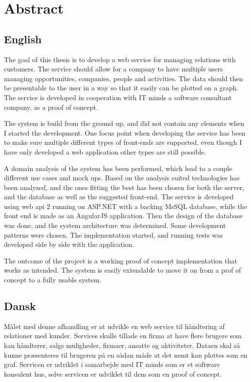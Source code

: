 \chapter{Abstract}
\label{chap:Abstract}

\section*{English}
The goal of this thesis is to develop a web service for managing relations with
customers. The service should allow for a company to have multiple users
managing opportunities, companies, people and activities. The data should then
be presentable to the user in a way so that it easily can be plotted on a graph.
The service is developed in cooperation with IT minds a software consultant
company, as a proof of concept.

The system is build from the ground up, and did not contain any elements when I
started the development. One focus point when developing the service has been to
make sure multiple different types of front-ends are supported, even though I
have only developed a web application other types are still possible.

A domain analysis of the system has been performed, which lead to a couple
different use cases and mock ups. Based on the analysis suited technologies has
been analyzed, and the ones fitting the best has been chosen for both the
server, and the database as well as the suggested front-end. The service is
developed using web api 2 running on ASP.NET with a backing MsSQL database,
while the front end is made as an AngularJS application. Then the design of the
database was done, and the system architecture was determined. Some development
patterns were chosen. The implementation started, and running tests was
developed side by side with the application.

The outcome of the project is a working proof of concept implementation that
works as intended. The system is easily extendable to move it on from a prof of
concept to a fully usable system.

\clearpage
\section*{Dansk}
Målet med denne afhandling er at udvikle en web service til håndtering af
relationer med kunder. Services skulle tillade en firma at have flere brugere
som kan håndterer, salgs muligheder, firmaer, ansatte og aktiviteter. Dataen
skal så kunne præsenteres til brugeren på en sådan måde at det nemt kan
plottes som en graf. Servicen er udviklet i samarbejde med IT minds som er et
software konsulent hus, selve servicen er udviklet til dem som en proof of concept.

